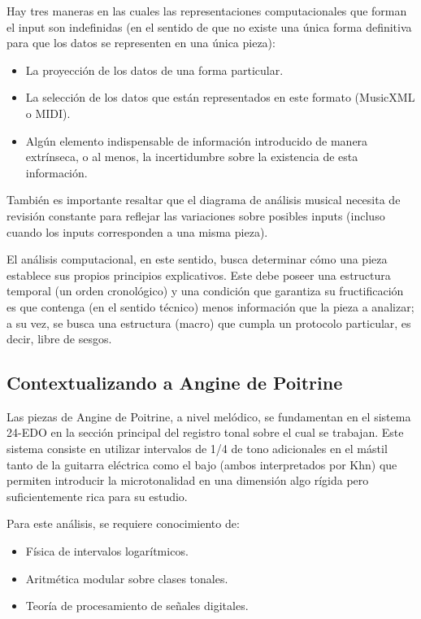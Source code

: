 \documentclass[11pt, a4paper]{article}
\begin{document}
Hay tres maneras en las cuales las representaciones computacionales que forman el input son indefinidas (en el sentido de que no existe una única forma definitiva para que los datos se representen en una única pieza):

\begin{itemize}
    \item La proyección de los datos de una forma particular.
    \item La selección de los datos que están representados en este formato (MusicXML o MIDI).
    \item Algún elemento indispensable de información introducido de manera extrínseca, o al menos, la incertidumbre sobre la existencia de esta información.
\end{itemize}

También es importante resaltar que el diagrama de análisis musical necesita de revisión constante para reflejar las variaciones sobre posibles inputs (incluso cuando los inputs corresponden a una misma pieza).

El análisis computacional, en este sentido, busca determinar cómo una pieza establece sus propios principios explicativos. Este debe poseer una estructura temporal (un orden cronológico) y una condición que garantiza su fructificación es que contenga (en el sentido técnico) menos información que la pieza a analizar; a su vez, se busca una estructura (macro) que cumpla un protocolo particular, es decir, libre de sesgos.

\subsection*{Contextualizando a Angine de Poitrine}

Las piezas de Angine de Poitrine, a nivel melódico, se fundamentan en el sistema 24-EDO en la sección principal del registro tonal sobre el cual se trabajan. Este sistema consiste en utilizar intervalos de 1/4 de tono adicionales en el mástil tanto de la guitarra eléctrica como el bajo (ambos interpretados por Khn) que permiten introducir la microtonalidad en una dimensión algo rígida pero suficientemente rica para su estudio.

Para este análisis, se requiere conocimiento de:

\begin{itemize}
    \item Física de intervalos logarítmicos.
    \item Aritmética modular sobre clases tonales.
    \item Teoría de procesamiento de señales digitales.
\end{itemize}
\end{document}
